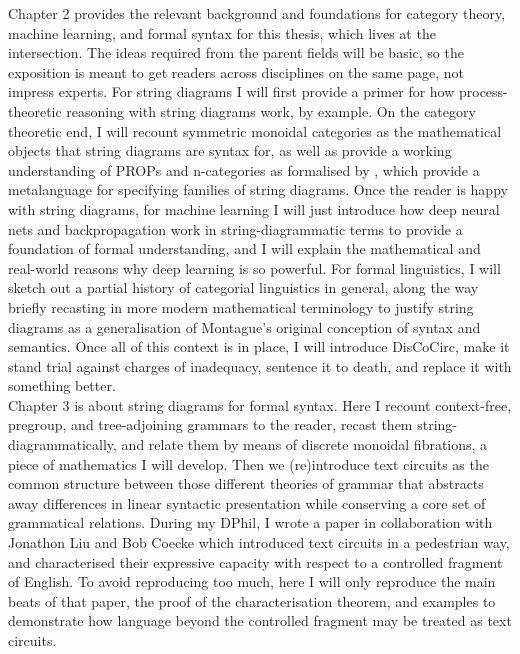 Chapter 2 provides the relevant background and foundations for category theory, machine learning, and formal syntax for this thesis, which lives at the intersection. The ideas required from the parent fields will be basic, so the exposition is meant to get readers across disciplines on the same page, not impress experts. For string diagrams I will first provide a primer for how process-theoretic reasoning with string diagrams work, by example. On the category theoretic end, I will recount symmetric monoidal categories as the mathematical objects that string diagrams are syntax for, as well as provide a working understanding of PROPs \citep{} and n-categories as formalised by \citep{}, which provide a metalanguage for specifying families of string diagrams. Once the reader is happy with string diagrams, for machine learning I will just introduce how deep neural nets and backpropagation work in string-diagrammatic terms to provide a foundation of formal understanding, and I will explain the mathematical and real-world reasons why deep learning is so powerful. For formal linguistics, I will sketch out a partial history of categorial linguistics in general, along the way briefly recasting \citep{} in more modern mathematical terminology to justify string diagrams as a generalisation of Montague's original conception of syntax and semantics. Once all of this context is in place, I will introduce DisCoCirc, make it stand trial against charges of inadequacy, sentence it to death, and replace it with something better.\\

Chapter 3 is about string diagrams for formal syntax. Here I recount context-free, pregroup, and tree-adjoining grammars to the reader, recast them string-diagrammatically, and relate them by means of discrete monoidal fibrations, a piece of mathematics I will develop. Then we (re)introduce text circuits as the common structure between those different theories of grammar that abstracts away differences in linear syntactic presentation while conserving a core set of grammatical relations. During my DPhil, I wrote a paper \citep{} in collaboration with Jonathon Liu and Bob Coecke which introduced text circuits in a pedestrian way, and characterised their expressive capacity with respect to a controlled fragment of English. To avoid reproducing too much, here I will only reproduce the main beats of that paper, the proof of the characterisation theorem, and examples to demonstrate how language beyond the controlled fragment may be treated as text circuits.\\

